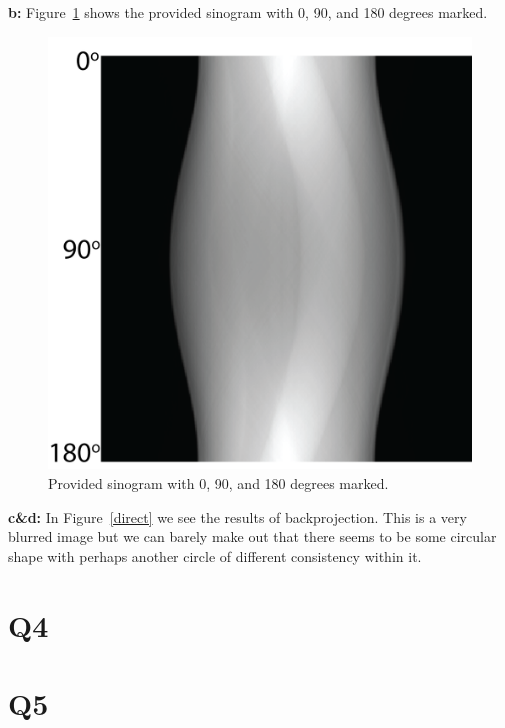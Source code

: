 \documentclass[12pt]{article}
\begin{document}
\noindent\textbf{b: }
Figure~\ref{sino} shows the provided sinogram with 0, 90, and 180 degrees marked.
\begin{figure}[H]
	
	\includegraphics[width=\textwidth]{sinogram.png}
	\caption{Provided sinogram with 0, 90, and 180 degrees marked.}
	\label{sino}
\end{figure}

\noindent\textbf{c\&d: }
In Figure~\ref{direct} we see the results of backprojection. This is a very blurred image but we can barely make out that there seems to be some circular shape with perhaps another circle of different consistency within it.

\section{Q4}

\section{Q5}






\begin{lstlisting}[style=Matlab-editor]
%%


\end{lstlisting}
\end{document}
